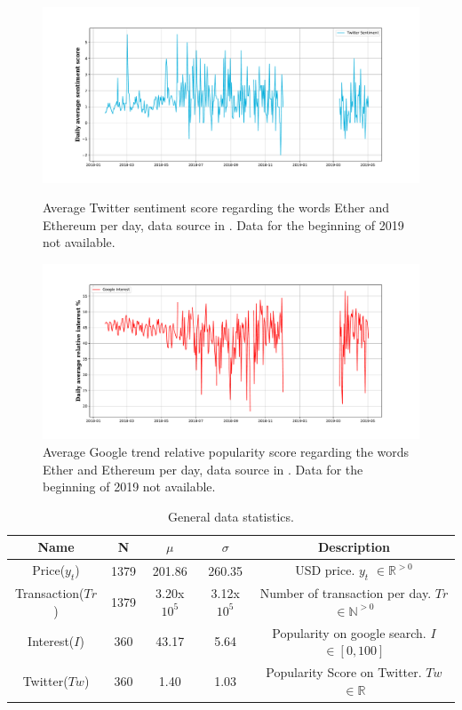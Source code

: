 \begin{figure}[!h]
	\centering
	\begin{minipage}[b]{0.85\textwidth}
		\includegraphics[width=\textwidth]{notebooks/data/twitter.pdf}
		\caption{ Average Twitter sentiment score regarding the words Ether and Ethereum per day, data source in \cite{deepblueai}. Data for the beginning of 2019 not available.} 
		\label{fig:twitter_plot}
	\end{minipage}
	\hfill
	\begin{minipage}[b]{0.85\textwidth}
		\includegraphics[width=\textwidth]{notebooks/data/google.pdf}
		\caption{  Average Google trend relative popularity score regarding the words Ether and Ethereum per day, data source in \cite{deepblueai}. Data for the beginning of 2019 not available.}
		\label{fig:google_plot}
	\end{minipage}
\end{figure}


\begin{table}[h!]
	\begin{center}
		\begin{tabular}{||c c c c c||} 
			\hline
			Name & N & $\mu$ & $\sigma$ & Description\\ [0.5ex] 
			\hline\hline
			Price($y_{t}$) & 1379 & 201.86 & 260.35 & USD price. $y_{t}$ $\in \mathbb{R}^{>0}$ \\ 
			\hline
			Transaction($Tr$) & 1379 & 3.20x$10^{5}$ & 3.12x$10^{5}$ & Number of transaction per day. $Tr$ $\in \mathbb{N}^{>0}$  \\ 
			\hline
			Interest($I$) & 360 & 43.17 & 5.64 & Popularity on google search. $I$ $\in [0,100]$  \\
			\hline
			Twitter($Tw$) & 360 & 1.40 & 1.03 & Popularity Score on Twitter.  $Tw$ $\in \mathbb{R}$ \\
			\hline
		\end{tabular}
		\caption{General data statistics.}
		\label{table:general_statistics}
	\end{center}
\end{table}


